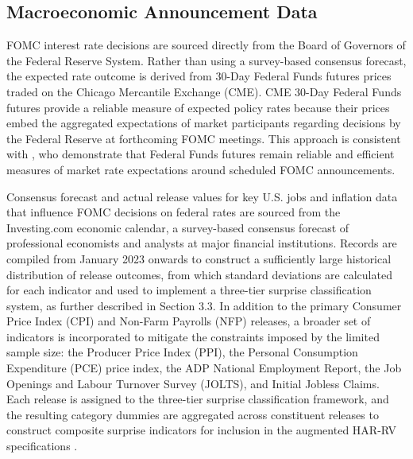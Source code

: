 \subsection{Macroeconomic Announcement Data}

FOMC interest rate decisions are sourced directly from the Board of Governors of the Federal Reserve System. Rather than using a survey-based consensus forecast, the expected rate outcome is derived from 30-Day Federal Funds futures prices traded on the Chicago Mercantile Exchange (CME). CME 30-Day Federal Funds futures provide a reliable measure of expected policy rates because their prices embed the aggregated expectations of market participants regarding decisions by the Federal Reserve at forthcoming FOMC meetings. This approach is consistent with \cite{BauerSwanson2023}, who demonstrate that Federal Funds futures remain reliable and efficient measures of market rate expectations around scheduled FOMC announcements.

Consensus forecast and actual release values for key U.S. jobs and inflation data that influence FOMC decisions on federal rates are sourced from the Investing.com economic calendar, a survey-based consensus forecast of professional economists and analysts at major financial institutions. Records are compiled from January 2023 onwards to construct a sufficiently large historical distribution of release outcomes, from which standard deviations are calculated for each indicator and used to implement a three-tier surprise classification system, as further described in Section 3.3. In addition to the primary Consumer Price Index (CPI) and Non-Farm Payrolls (NFP) releases, a broader set of indicators is incorporated to mitigate the constraints imposed by the limited sample size: the Producer Price Index (PPI), the Personal Consumption Expenditure (PCE) price index, the ADP National Employment Report, the Job Openings and Labour Turnover Survey (JOLTS), and Initial Jobless Claims. Each release is assigned to the three-tier surprise classification framework, and the resulting category dummies are aggregated across constituent releases to construct composite surprise indicators for inclusion in the augmented HAR-RV specifications \citep{Gilbert2017}.

